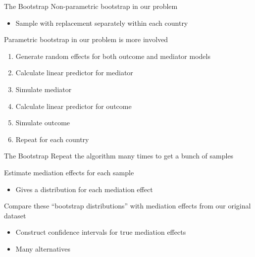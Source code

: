 \documentclass[14pt]{beamer}
\begin{document}
\begin{frame}{The Bootstrap}
    Non-parametric bootstrap in our problem
    \begin{itemize}
        \item Sample with replacement separately within each country
    \end{itemize}
    
    Parametric bootstrap in our problem is more involved
    \begin{enumerate}
        \item Generate random effects for both outcome and mediator models
        \item Calculate linear predictor for mediator
        \item Simulate mediator
        \item Calculate linear predictor for outcome
        \item Simulate outcome
        \item Repeat for each country
    \end{enumerate}
    
\end{frame}

\begin{frame}{The Bootstrap}
    Repeat the algorithm many times to get a bunch of samples \newline
 
    Estimate mediation effects for each sample 
    \begin{itemize}
        \item Gives a distribution for each mediation effect \newline
    \end{itemize}

    Compare these ``bootstrap distributions'' with mediation effects from our original dataset
    \begin{itemize}
        \item Construct confidence intervals for true mediation effects
        \item Many alternatives
    \end{itemize}
\end{frame}
\end{document}
